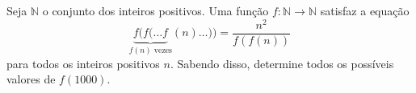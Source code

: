 Seja $\mathbb{N}$ o conjunto dos inteiros positivos.
Uma função $f:\mathbb{N}\to\mathbb{N}$ satisfaz a equação \[\underbrace{f(f(\ldots f}_{f(n)\text{ vezes}}(n)\ldots))=\frac{n^2}{f(f(n))}\] para todos os inteiros positivos $n$. Sabendo disso, determine todos os possíveis valores de $f(1000)$.
